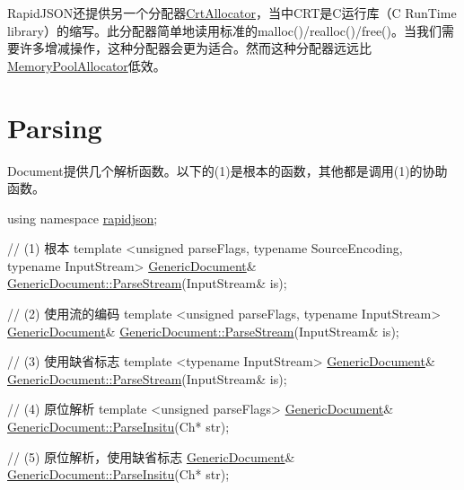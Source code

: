 Rapid\+J\+S\+O\+N还提供另一个分配器{\ttfamily \hyperlink{class_crt_allocator}{Crt\+Allocator}}，当中\+C\+R\+T是\+C运行库（C Run\+Time library）的缩写。此分配器简单地读用标准的{\ttfamily malloc()}/{\ttfamily realloc()}/{\ttfamily free()}。当我们需要许多增减操作，这种分配器会更为适合。然而这种分配器远远比{\ttfamily \hyperlink{class_memory_pool_allocator}{Memory\+Pool\+Allocator}}低效。\hypertarget{md_Commun_Externe_RapidJSON_doc_sax.zh-cn_Parsing}{}\section{Parsing}\label{md_Commun_Externe_RapidJSON_doc_sax.zh-cn_Parsing}
{\ttfamily Document}提供几个解析函数。以下的(1)是根本的函数，其他都是调用(1)的协助函数。


\begin{DoxyCode}
\textcolor{keyword}{using namespace }\hyperlink{namespacerapidjson}{rapidjson};

\textcolor{comment}{// (1) 根本}
\textcolor{keyword}{template} <\textcolor{keywordtype}{unsigned} parseFlags, \textcolor{keyword}{typename} SourceEncoding, \textcolor{keyword}{typename} InputStream>
\hyperlink{class_generic_document}{GenericDocument}& \hyperlink{class_generic_document_afe94c0abc83a20f2d7dc1ba7677e6238}{GenericDocument::ParseStream}(InputStream& is);

\textcolor{comment}{// (2) 使用流的编码}
\textcolor{keyword}{template} <\textcolor{keywordtype}{unsigned} parseFlags, \textcolor{keyword}{typename} InputStream>
\hyperlink{class_generic_document}{GenericDocument}& \hyperlink{class_generic_document_afe94c0abc83a20f2d7dc1ba7677e6238}{GenericDocument::ParseStream}(InputStream& is);

\textcolor{comment}{// (3) 使用缺省标志}
\textcolor{keyword}{template} <\textcolor{keyword}{typename} InputStream>
\hyperlink{class_generic_document}{GenericDocument}& \hyperlink{class_generic_document_afe94c0abc83a20f2d7dc1ba7677e6238}{GenericDocument::ParseStream}(InputStream& is);

\textcolor{comment}{// (4) 原位解析}
\textcolor{keyword}{template} <\textcolor{keywordtype}{unsigned} parseFlags>
\hyperlink{class_generic_document}{GenericDocument}& \hyperlink{class_generic_document_a301f8f297a5a0da4b6be5459ad766f75}{GenericDocument::ParseInsitu}(Ch* str);

\textcolor{comment}{// (5) 原位解析，使用缺省标志}
\hyperlink{class_generic_document}{GenericDocument}& \hyperlink{class_generic_document_a301f8f297a5a0da4b6be5459ad766f75}{GenericDocument::ParseInsitu}(Ch* str);


\end{DoxyCode}
